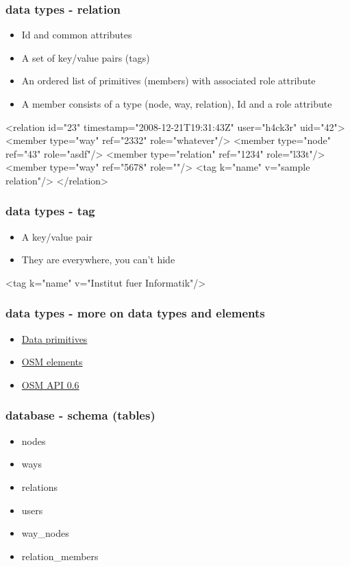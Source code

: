 \documentclass{beamer}
\begin{document}
\begin{frame}[fragile]
    \frametitle{data types - relation}
    \begin{itemize}
        \item Id and common attributes 
        \item A set of key/value pairs (tags)
        \item An ordered list of primitives (members) with associated role attribute
        \item A member consists of a type (node, way, relation), Id and a role attribute
    \end{itemize}
    \begin{xmlcode}
    <relation id="23" timestamp="2008-12-21T19:31:43Z" user="h4ck3r" uid="42">
        <member type="way" ref="2332" role="whatever"/>
        <member type="node" ref="43" role="asdf"/>
        <member type="relation" ref="1234" role="l33t"/>
        <member type="way" ref="5678" role=""/>
        <tag k="name" v="sample relation"/>
    </relation>
    \end{xmlcode}
\end{frame}
\begin{frame}[fragile]
    \frametitle{data types - tag}
    \begin{itemize}
        \item A key/value pair
        \item They are everywhere, you can't hide
    \end{itemize}
    \begin{xmlcode}
    <tag k="name" v="Institut fuer Informatik"/>
    \end{xmlcode}
\end{frame}
\begin{frame}[fragile]
    \frametitle{data types - more on data types and elements}
    \begin{itemize}
        \item \href{http://wiki.openstreetmap.org/wiki/Data_Primitives}{Data primitives}
        \item \href{http://wiki.openstreetmap.org/wiki/Elements}{OSM elements}
        \item \href{http://wiki.openstreetmap.org/wiki/API\_v0.6}{OSM API 0.6}
    \end{itemize}
\end{frame}
\begin{frame}[fragile]
    \frametitle{database - schema (tables)}
    \begin{itemize}
        \item nodes
        \item ways
        \item relations
        \item users
        \item way\_nodes
        \item relation\_members
    \end{itemize}
\end{frame}
\end{document}
